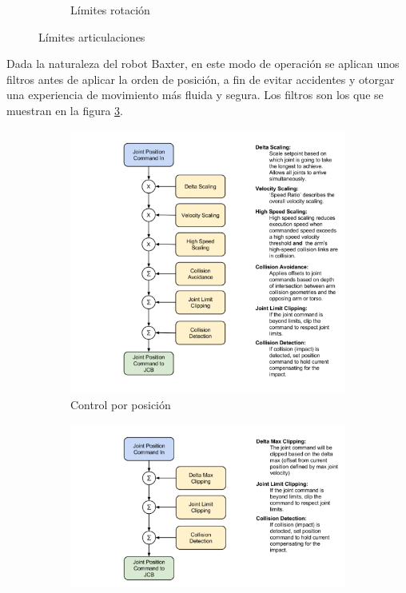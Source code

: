 \begin{figure}[]
\begin{subfigure}[b]{0.4\textwidth}
		\caption{Límites rotación}
		\label{fig:metodos/limits2}
	\end{subfigure}
	\caption{Límites articulaciones}
	\label{fig:metodos/limits}
\end{figure}

Dada la naturaleza del robot Baxter, en este modo de operación se aplican unos filtros antes de aplicar la orden de posición, a fin de evitar accidentes y otorgar una experiencia de movimiento más fluida y segura. Los filtros son los que se muestran en la figura \ref{fig:metodos/position_filters}.

\begin{figure}[]
	\centering
	\begin{subfigure}[b]{0.24\textwidth}
		\includegraphics[trim=0 0 235 0, clip, width=\textwidth]{imagenes/metodos/baxter_position_filters.png}
		\caption{Control por posición}
		\label{fig:metodos/position_filters}
	\end{subfigure}
	\begin{subfigure}[b]{0.24\textwidth}
		\centering
		\includegraphics[trim=0 0 230 0, clip, width=\textwidth]{imagenes/metodos/baxter_position_raw_filters.png}

\end{subfigure}
\end{figure}
